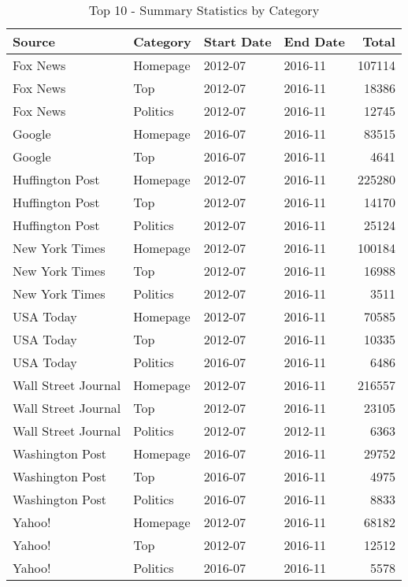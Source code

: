 \begin{table}[ht]
\centering
\caption{Top 10 - Summary Statistics by Category} 
\label{tab:top10_summary_category}
\begin{tabular}{llllr}
  \hline
Source & Category & Start Date & End Date & Total \\ 
  \hline
Fox News & Homepage & 2012-07 & 2016-11 & 107114 \\ 
  Fox News & Top & 2012-07 & 2016-11 & 18386 \\ 
  Fox News & Politics & 2012-07 & 2016-11 & 12745 \\ 
  Google & Homepage & 2016-07 & 2016-11 & 83515 \\ 
  Google & Top & 2016-07 & 2016-11 & 4641 \\ 
  Huffington Post & Homepage & 2012-07 & 2016-11 & 225280 \\ 
  Huffington Post & Top & 2012-07 & 2016-11 & 14170 \\ 
  Huffington Post & Politics & 2012-07 & 2016-11 & 25124 \\ 
  New York Times & Homepage & 2012-07 & 2016-11 & 100184 \\ 
  New York Times & Top & 2012-07 & 2016-11 & 16988 \\ 
  New York Times & Politics & 2012-07 & 2016-11 & 3511 \\ 
  USA Today & Homepage & 2012-07 & 2016-11 & 70585 \\ 
  USA Today & Top & 2012-07 & 2016-11 & 10335 \\ 
  USA Today & Politics & 2016-07 & 2016-11 & 6486 \\ 
  Wall Street Journal & Homepage & 2012-07 & 2016-11 & 216557 \\ 
  Wall Street Journal & Top & 2012-07 & 2016-11 & 23105 \\ 
  Wall Street Journal & Politics & 2012-07 & 2012-11 & 6363 \\ 
  Washington Post & Homepage & 2016-07 & 2016-11 & 29752 \\ 
  Washington Post & Top & 2016-07 & 2016-11 & 4975 \\ 
  Washington Post & Politics & 2016-07 & 2016-11 & 8833 \\ 
  Yahoo! & Homepage & 2012-07 & 2016-11 & 68182 \\ 
  Yahoo! & Top & 2012-07 & 2016-11 & 12512 \\ 
  Yahoo! & Politics & 2016-07 & 2016-11 & 5578 \\ 
   \hline
\end{tabular}
\end{table}
